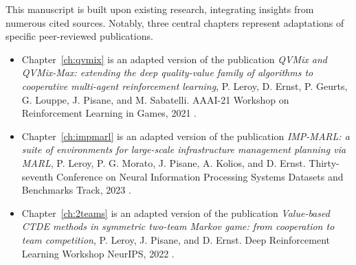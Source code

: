 This manuscript is built upon existing research, integrating insights from numerous cited sources.
Notably, three central chapters represent adaptations of specific peer-reviewed publications.

\begin{itemize}
\item Chapter~\ref{ch:qvmix} is an adapted version of the publication \textit{QVMix and QVMix-Max: extending the deep quality-value family of algorithms to cooperative multi-agent reinforcement learning}, P. Leroy, D. Ernst, P. Geurts, G. Louppe, J. Pisane, and M. Sabatelli. AAAI-21 Workshop on Reinforcement Learning in Games, 2021 \citep{leroy2020qvmix}.

\item Chapter~\ref{ch:impmarl} is an adapted version of the publication \textit{IMP-MARL: a suite of environments for large-scale infrastructure management planning via MARL}, P. Leroy, P. G. Morato, J. Pisane, A. Kolios, and D. Ernst. Thirty-seventh Conference on Neural Information Processing Systems Datasets and Benchmarks Track, 2023 \citep{leroy2023impmarl}.

\item Chapter~\ref{ch:2teams} is an adapted version of the publication \textit{Value-based CTDE methods in symmetric two-team Markov game: from cooperation to team competition}, P. Leroy, J. Pisane, and D. Ernst. Deep Reinforcement Learning Workshop NeurIPS, 2022 \citep{leroy2022twoteam}.
\end{itemize}

